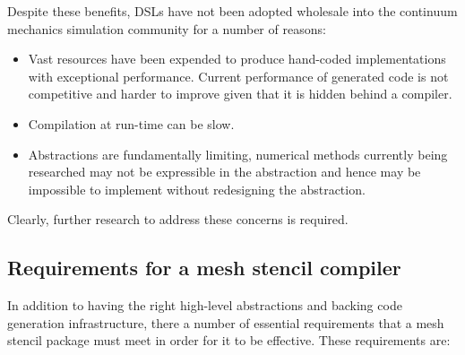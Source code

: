 \documentclass[thesis]{subfiles}
\begin{document}
Despite these benefits, DSLs have not been adopted wholesale into the continuum mechanics simulation community for a number of reasons:

\begin{itemize}
  \item
    Vast resources have been expended to produce hand-coded implementations with exceptional performance.
    Current performance of generated code is not competitive and harder to improve given that it is hidden behind a compiler.
  \item
    Compilation at run-time can be slow.
  \item
    Abstractions are fundamentally limiting, numerical methods currently being researched may not be expressible in the abstraction and hence may be impossible to implement without redesigning the abstraction.
\end{itemize}

Clearly, further research to address these concerns is required.


\subsection{Requirements for a mesh stencil compiler}


In addition to having the right high-level abstractions and backing code generation infrastructure, there a number of essential requirements that a mesh stencil package must meet in order for it to be effective.
These requirements are:
\end{document}
